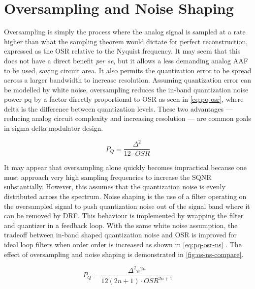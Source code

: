 \section{Oversampling and Noise Shaping}
\label{sec:in-os-ns}

Oversampling is simply the process where the analog signal is sampled at a rate higher than what the sampling theorem would dictate for perfect reconstruction, expressed as the \gls{OSR} relative to the Nyquist frequency. It may seem that this does not have a direct benefit \emph{per se}, but it allows a less demanding analog \gls{AAF} to be used, saving circuit area. It also permits the quantization error to be spread across a larger bandwidth to increase resolution. Assuming quantization error can be modelled by white noise, oversampling reduces the in-band quantization noise power \gls{pq} by a factor directly proportional to \gls{OSR} \cite{DeLaRosa2011} as seen in \autoref{eq:pq-osr}, where \gls{delta} is the difference between quantization levels. These two advantages --- reducing analog circuit complexity and increasing resolution --- are common goals in sigma delta modulator design.

\begin{equation}
	P_Q = \frac{\Delta^2}{12 \cdot OSR} \label{eq:pq-osr}
\end{equation}

It may appear that oversampling alone quickly becomes impractical because one must approach very high sampling frequencies to increase the \gls{SQNR} substantially. However, this assumes that the quantization noise is evenly distributed across the spectrum. Noise shaping is the use of a filter operating on the oversampled signal to push quantization noise out of the signal band where it can be removed by \gls{DRF}. This behaviour is implemented by wrapping the filter and quantizer in a feedback loop. With the same white noise assumption, the tradeoff between in-band shaped quantization noise and \gls{OSR} is improved for ideal loop filters when order \gls{order} is increased as shown in \autoref{eq:pq-osr-ns} \cite{DeLaRosa2011}. The effect of oversampling and noise shaping is demonstrated in \autoref{fig:os-ns-compare}. 

\begin{equation}
	P_Q = \frac{\Delta^2\pi^{2n}}{12\left(2n + 1\right) \cdot OSR^{2n + 1}} \label{eq:pq-osr-ns}
\end{equation}


